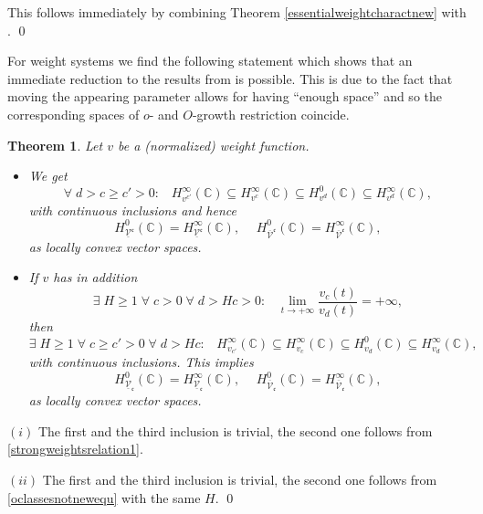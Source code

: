 \documentclass[10pt]{amsart}%
\numberwithin{equation}{section}
\theoremstyle{plain}
\newtheorem{theorem}[proposition]{Theorem}
\newcommand{\CC}{\mathbb{C}}
\begin{document}
This follows immediately by combining Theorem \ref{essentialweightcharactnew} with \cite[Thm. 3.4 \& 3.5]{weightedentirecharacterization}.
\qed\enddemo

For weight systems we find the following statement which shows that an immediate reduction to the results from \cite{weightedentirecharacterization} is possible. This is due to the fact that moving the appearing parameter allows for having ``enough space'' and so the corresponding spaces of $o$- and $O$-growth restriction coincide.

\begin{theorem}\label{oclassesnotnew}
	Let $v$ be a (normalized) weight function.
	\begin{itemize}
		\item[$(i)$] We get
		$$\forall\;d>c\ge c'>0:\;\;\;H^{\infty}_{v^{c'}}(\CC)\subseteq H^{\infty}_{v^c}(\CC)\subseteq H^{0}_{v^d}(\CC)\subseteq H^{\infty}_{v^d}(\CC),$$
		with continuous inclusions and hence
		$$H^{0}_{\underline{\mathcal{V}}^{\mathfrak{c}}}(\CC)=H^{\infty}_{\underline{\mathcal{V}}^{\mathfrak{c}}}(\CC),\hspace{15pt}H^{0}_{\overline{\mathcal{V}}^{\mathfrak{c}}}(\CC)=H^{\infty}_{\overline{\mathcal{V}}^{\mathfrak{c}}}(\CC),$$
		as locally convex vector spaces.
		
		\item[$(ii)$] If $v$ has in addition
		\begin{equation}\label{oclassesnotnewequ}
			\exists\;H\ge 1\;\forall\;c>0\;\forall\;d>Hc>0:\;\;\;\lim_{t\rightarrow+\infty}\frac{v_c(t)}{v_d(t)}=+\infty,
		\end{equation}
		then
		$$\exists\;H\ge 1\;\forall\;c\ge c'>0\;\forall\;d>Hc:\;\;\;H^{\infty}_{v_{c'}}(\CC)\subseteq H^{\infty}_{v_c}(\CC)\subseteq H^{0}_{v_d}(\CC)\subseteq H^{\infty}_{v_d}(\CC),$$
		with continuous inclusions. This implies
		$$H^{0}_{\underline{\mathcal{V}}_{\mathfrak{c}}}(\CC)=H^{\infty}_{\underline{\mathcal{V}}_{\mathfrak{c}}}(\CC),\hspace{15pt}H^{0}_{\overline{\mathcal{V}}_{\mathfrak{c}}}(\CC)=H^{\infty}_{\overline{\mathcal{V}}_{\mathfrak{c}}}(\CC),$$
		as locally convex vector spaces.
	\end{itemize}
\end{theorem}

$(i)$ The first and the third inclusion is trivial, the second one follows from \eqref{strongweightsrelation1}.

$(ii)$  The first and the third inclusion is trivial, the second one follows from \eqref{oclassesnotnewequ} with the same $H$.
\qed\enddemo
\end{document}
